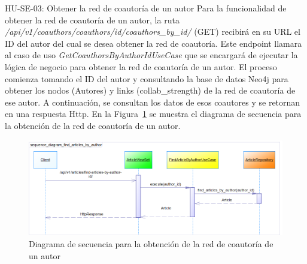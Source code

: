 
HU-SE-03: Obtener la red de coautoría de un autor
Para la funcionalidad de obtener la red de coautoría de un autor, la ruta \textit{/api/v1/coauthors/coauthors/{id}/coauthors\_by\_id/} (GET) recibirá en su URL el ID del autor del cual se desea obtener la red de coautoría.
Este endpoint llamara al caso de uso \textit{GetCoauthorsByAuthorIdUseCase} que se encargará de ejecutar la lógica de negocio para obtener la red de coautoría de un autor.
El proceso comienza tomando el ID del autor y consultando la base de datos Neo4j para obtener los nodos (Autores) y links (collab\_strength) de la red de coautoría de ese autor. A continuación, se consultan los datos de esos coautores y se retornan en una respuesta Http.
En la Figura~\ref{fig:sequence-diagram-get-coauthors-by-author-id} se muestra el diagrama de secuencia para la obtención de la red de coautoría de un autor.
\begin{figure}[H]
    \centering
    \includegraphics[scale=0.7]{../02Figures/02Chapter/Sprints/Sprint-4/sequence_diagram_find_articles_by_author.png}
    \caption{Diagrama de secuencia para la obtención de la red de coautoría de un autor}\label{fig:sequence-diagram-get-coauthors-by-author-id}
\end{figure}

